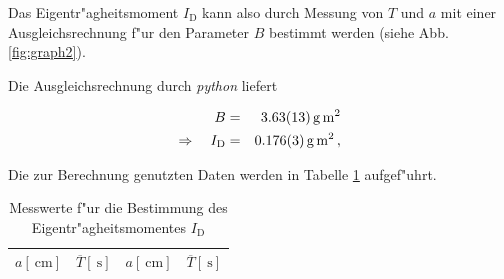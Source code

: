 
		\clearpage

		Das Eigentr"agheitsmoment $I_\mathrm{D}$ kann also durch Messung von $T$ und $a$ mit einer Ausgleichsrechnung f"ur den Parameter $B$ bestimmt werden (siehe Abb. \ref{fig:graph2}).

		Die Ausgleichsrechnung durch \emph{python} liefert

		\begin{eqnarray*}
			B & = & \SI{3.63 (13)}{\gram \meter \squared} \\
			\Rightarrow \quad I_\mathrm{D} & = & \SI{.176 (3)}{\gram \meter \squared} \,,
		\end{eqnarray*}



		Die zur Berechnung genutzten Daten werden in Tabelle \ref{tabelle:eigentraegheitsmoment} aufgef"uhrt.

		\begin{table}[h!]
			\begin{center}
				\caption{Messwerte f"ur die Bestimmung des Eigentr"agheitsmomentes $I_\mathrm{D}$ \label{tabelle:eigentraegheitsmoment}}
				\begin{tabular}{|c|c||c|c|}
					\hline
					$a [\SI{}{\centi \meter}]$ & $\overline{T} [\SI{}{\second}]$ & $a [\SI{}{\centi \meter}]$ & $\overline{T} [\SI{}{\second}]$\\
					\hline 
					\hline
					
					\hline 
				\end{tabular}
			\end{center}
		\end{table}

